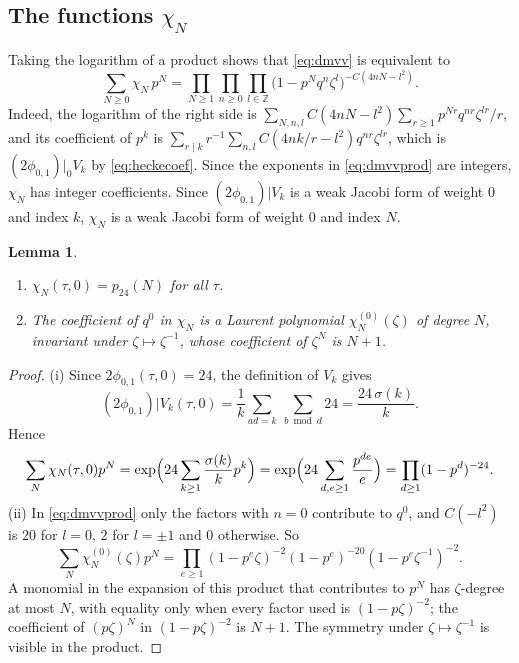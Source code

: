 \documentclass[11pt]{amsart}
\newtheorem{lemma}[theorem]{Lemma}
\theoremstyle{definition}
\newcommand{\ZZ}{\mathbb{Z}}
\newcommand{\pf}{p_{24}}
\begin{document}
\subsection{The functions \texorpdfstring{$\chi_N$}{chi\_N}}
Taking the logarithm of a product shows that \eqref{eq:dmvv} is equivalent to
\begin{equation}\label{eq:dmvvprod}
\sum_{N\ge0}\chi_N\,p^N=\prod_{N\ge1}\prod_{n\ge0}\prod_{l\in\ZZ}\bigl(1-p^Nq^n\zeta^l\bigr)^{-C(4nN-l^2)} .
\end{equation}
Indeed, the logarithm of the right side is $\sum_{N,n,l}C(4nN-l^2)\sum_{r\ge1}p^{Nr}q^{nr}\zeta^{lr}/r$, and its coefficient of $p^k$ is $\sum_{r\mid k}r^{-1}\sum_{n,l}C(4nk/r-l^2)q^{nr}\zeta^{lr}$, which is $(2\phi_{0,1})|_0V_k$ by \eqref{eq:heckecoef}. Since the exponents in \eqref{eq:dmvvprod} are integers, $\chi_N$ has integer coefficients. Since $(2\phi_{0,1})|V_k$ is a weak Jacobi form of weight $0$ and index $k$, $\chi_N$ is a weak Jacobi form of weight $0$ and index $N$.

\begin{lemma}\label{lem:chi}
\begin{enumerate}
\item[(i)] $\chi_N(\tau,0)=\pf(N)$ for all $\tau$.
\item[(ii)] The coefficient of $q^0$ in $\chi_N$ is a Laurent polynomial $\chi_N^{(0)}(\zeta)$ of degree $N$, invariant under $\zeta\mapsto\zeta^{-1}$, whose coefficient of $\zeta^N$ is $N+1$.
\end{enumerate}
\end{lemma}

\begin{proof}
(i) Since $2\phi_{0,1}(\tau,0)=24$, the definition of $V_k$ gives
\[
(2\phi_{0,1})|V_k(\tau,0)=\frac1k\sum_{ad=k}\ \sum_{b\bmod d}24=\frac{24\,\sigma(k)}{k}.
\]
Hence
\[
\sum_N\chi_N(\tau,0)p^N=\exp\Bigl(24\sum_{k\ge1}\frac{\sigma(k)}{k}p^k\Bigr)=\exp\Bigl(24\sum_{d,e\ge1}\frac{p^{de}}{e}\Bigr)=\prod_{d\ge1}(1-p^d)^{-24}.
\]
(ii) In \eqref{eq:dmvvprod} only the factors with $n=0$ contribute to $q^0$, and $C(-l^2)$ is $20$ for $l=0$, $2$ for $l=\pm1$ and $0$ otherwise. So
\[
\sum_N\chi^{(0)}_N(\zeta)p^N=\prod_{e\ge1}(1-p^e\zeta)^{-2}(1-p^e)^{-20}(1-p^e\zeta^{-1})^{-2}.
\]
A monomial in the expansion of this product that contributes to $p^N$ has $\zeta$-degree at most $N$, with equality only when every factor used is $(1-p\zeta)^{-2}$; the coefficient of $(p\zeta)^N$ in $(1-p\zeta)^{-2}$ is $N+1$. The symmetry under $\zeta\mapsto\zeta^{-1}$ is visible in the product.
\end{proof}
\end{document}
